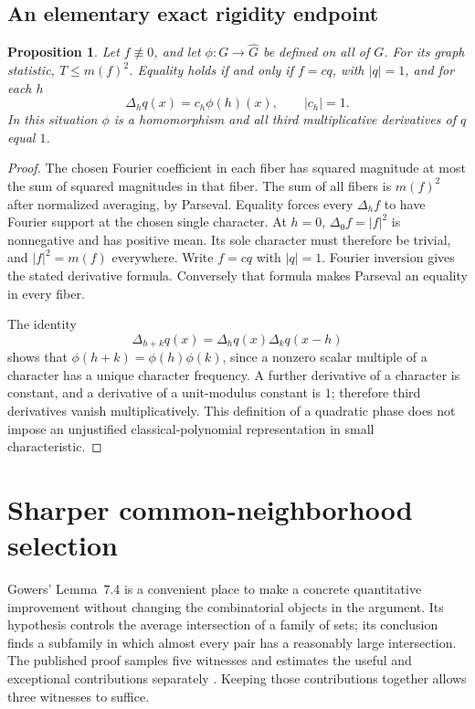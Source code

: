 \documentclass[11pt,letterpaper]{article}
\numberwithin{equation}{section}
\newtheorem{proposition}[theorem]{Proposition}
\theoremstyle{definition}
\theoremstyle{remark}
\newcommand{\1}{\mathbf 1}
\newcommand{\srctag}[1]{\texorpdfstring{\enspace\textup{[#1]}}{ [#1]}}
\newcommand{\srcnote}[2]{\par\noindent{\small\textit{Source #1, delivered #2.}}\par}
\begin{document}
\subsection{An elementary exact rigidity endpoint}
\begin{proposition}\label{gsr:en:02:prop:maximal}
Let $f\not\equiv0$, and let $\phi:G\to\widehat G$ be defined on all of $G$. For its graph statistic, $T\leq m(f)^2$. Equality holds if and only if $f=cq$, with $|q|=1$, and for each $h$
\[
 \Delta_hq(x)=c_h\phi(h)(x),\qquad |c_h|=1.
\]
In this situation $\phi$ is a homomorphism and all third multiplicative derivatives of $q$ equal $1$.
\end{proposition}
\begin{proof}
The chosen Fourier coefficient in each fiber has squared magnitude at most the sum of squared magnitudes in that fiber. The sum of all fibers is $m(f)^2$ after normalized averaging, by Parseval. Equality forces every $\Delta_hf$ to have Fourier support at the chosen single character. At $h=0$, $\Delta_0f=|f|^2$ is nonnegative and has positive mean. Its sole character must therefore be trivial, and $|f|^2=m(f)$ everywhere. Write $f=cq$ with $|q|=1$. Fourier inversion gives the stated derivative formula. Conversely that formula makes Parseval an equality in every fiber.

The identity
\[
 \Delta_{h+k}q(x)=\Delta_hq(x)\Delta_kq(x-h)
\]
shows that $\phi(h+k)=\phi(h)\phi(k)$, since a nonzero scalar multiple of a character has a unique character frequency. A further derivative of a character is constant, and a derivative of a unit-modulus constant is $1$; therefore third derivatives vanish multiplicatively. This definition of a quadratic phase does not impose an unjustified classical-polynomial representation in small characteristic.
\end{proof}

\section[{Sharper common-neighborhood selection\srctag{03}}]{Sharper common-neighborhood selection}\label{gsr:en:03:sec:d7}\label{gsr:en:03:drc:section}
\srcnote{03}{Section 7}

Gowers' Lemma~7.4 is a convenient place to make a concrete quantitative
improvement without changing the combinatorial objects in the argument.
Its hypothesis controls the average intersection of a family of sets; its
conclusion finds a subfamily in which almost every pair has a reasonably
large intersection.  The published proof samples five witnesses and
estimates the useful and exceptional contributions separately
\cite{gowers}.  Keeping those contributions together allows three
witnesses to suffice.
\end{document}
